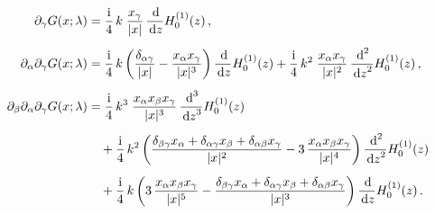 \begin{align*}
  \partial_\gamma G(x; \lambda) &= \frac{\ii}{4}\, k\;  \frac{x_\gamma}{|x|}\, \frac{\d{}}{\d z} H_0^{(1)}(z)\,, \\[0.5em]
  \partial_\alpha \partial_\gamma G(x; \lambda) 
  &=  \frac{\ii}{4}\,  k \,\bigg(\frac{\delta_{\alpha\gamma}}{|x|} - \frac{x_\alpha x_\gamma}{|x|^3} \bigg)\, \frac{\d{}}{\d z} H_0^{(1)}(z) + \frac{\ii}{4} \, k^2 \;  \frac{x_\alpha x_\gamma}{|x|^2} \, \frac{\d{}^2}{\d z^2} H_0^{(1)}(z)\,, \\[0.5em]
  \partial_\beta \partial_\alpha \partial_\gamma G(x; \lambda)
  &= \frac{\ii}{4} \, k^3 \; \frac{x_\alpha x_\beta x_\gamma}{|x|^3} \, \frac{\d{}^3}{\d z^3} H_0^{(1)}(z)\\[0.5em]
  &\quad + \frac{\ii}{4} \, k^2 \,\bigg(\frac{\delta_{\beta\gamma} x_\alpha + \delta_{\alpha \gamma} x_\beta + \delta_{\alpha \beta} x_\gamma}{|x|^2} - 3\, \frac{x_\alpha x_\beta x_\gamma}{|x|^4} \bigg)\, \frac{\d{}^2}{\d z^2} H_0^{(1)}(z) \\[0.5em]
  &\quad+ \frac{\ii}{4} \, k \, \bigg( 3\, \frac{x_\alpha x_\beta x_\gamma}{|x|^5} - \frac{\delta_{\beta\gamma} x_\alpha + \delta_{\alpha\gamma} x_\beta + \delta_{\alpha\beta} x_\gamma}{|x|^3} \bigg)\, \frac{\d{}}{\d z} H_0^{(1)}(z) \,.
\end{align*}

